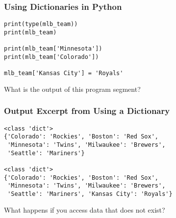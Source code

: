 \documentclass[14pt,aspectratio=169]{beamer}
\begin{document}
%
\begin{frame}[fragile]
  \frametitle{Using Dictionaries in Python}
  \hspace*{.1in}
  \begin{minipage}{6in}
    \vspace*{.25in}
    \begin{verbatim}
print(type(mlb_team))
print(mlb_team)

print(mlb_team['Minnesota'])
print(mlb_team['Colorado'])

mlb_team['Kansas City'] = 'Royals'
    \end{verbatim}
  \end{minipage}
  \vspace*{.025in}
  \begin{center}
    \normalsize \noindent What is the output of this program segment? \\
  \end{center}
\end{frame}

%
\begin{frame}[fragile]
  \frametitle{Output Excerpt from Using a Dictionary}
  \begin{minipage}{6in}
    \vspace*{.25in}
    \begin{verbatim}
<class 'dict'>
{'Colorado': 'Rockies', 'Boston': 'Red Sox',
 'Minnesota': 'Twins', 'Milwaukee': 'Brewers',
 'Seattle': 'Mariners'}

<class 'dict'>
{'Colorado': 'Rockies', 'Boston': 'Red Sox',
 'Minnesota': 'Twins', 'Milwaukee': 'Brewers',
 'Seattle': 'Mariners', 'Kansas City': 'Royals'}
    \end{verbatim}
  \end{minipage}
  \vspace*{.025in}
  \begin{center}
    \normalsize \noindent What happens if you access data that does not exist? \\
  \end{center}
\end{frame}
\end{document}
